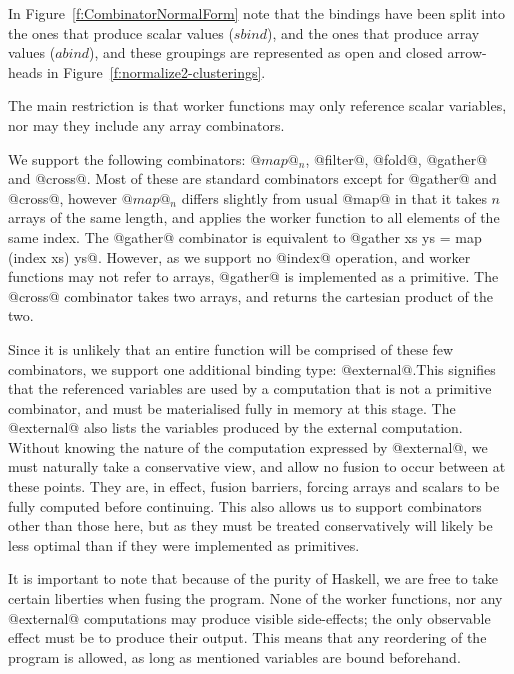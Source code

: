 In Figure~\ref{f:CombinatorNormalForm} note that the bindings have been split into the ones that produce scalar values ($sbind$), and the ones that produce array values ($abind$), and these groupings are represented as open and closed arrow-heads in Figure~\ref{f:normalize2-clusterings}.


The main restriction is that worker functions may only reference scalar variables, nor may they include any array combinators.

We support the following combinators: $@map@_n$, @filter@, @fold@, @gather@ and @cross@.
Most of these are standard combinators except for @gather@ and @cross@, however $@map@_n$ differs slightly from usual @map@ in that it takes $n$ arrays of the same length, and applies the worker function to all elements of the same index. The @gather@ combinator is equivalent to @gather xs ys = map (index xs) ys@. However, as we support no @index@ operation, and worker functions may not refer to arrays, @gather@ is implemented as a primitive.
The @cross@ combinator takes two arrays, and returns the cartesian product of the two.

Since it is unlikely that an entire function will be comprised of these few combinators, we support one additional binding type: @external@.This signifies that the referenced variables are used by a computation that is not a primitive combinator, and must be materialised fully in memory at this stage. The @external@ also lists the variables produced by the external computation. Without knowing the nature of the computation expressed by @external@, we must naturally take a conservative view, and allow no fusion to occur between at these points. They are, in effect, fusion barriers, forcing arrays and scalars to be fully computed before continuing. This also allows us to support combinators other than those here, but as they must be treated conservatively will likely be less optimal than if they were implemented as primitives.

It is important to note that because of the purity of Haskell, we are free to take certain liberties when fusing the program.
None of the worker functions, nor any @external@ computations may produce visible side-effects; the only observable effect must be to produce their output.
This means that any reordering of the program is allowed, as long as mentioned variables are bound beforehand.



